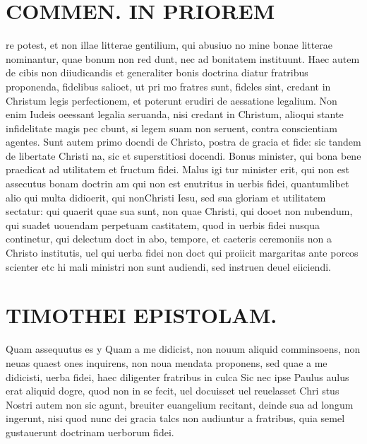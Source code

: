 \documentclass{article}
\begin{document}
\begin{pages}
\section*{COMMEN. IN PRIOREM }
\marginpar{[ p.102 ]}\pstart re potest, et non illae litterae gentilium, qui abusiuo no mine bonae litterae nominantur, quae bonum non red dunt, nec ad bonitatem instituunt. Haec autem de cibis non diiudicandis et generaliter bonis doctrina diatur fratribus proponenda, fidelibus salioet, ut pri mo fratres sunt, fideles sint, credant in Christum legis perfectionem, et poterunt erudiri de aessatione legalium. Non enim Iudeis oeessant legalia seruanda, nisi credant in Christum, alioqui stante infidelitate magis pec cbunt, si legem suam non seruent, contra conscientiam agentes. Sunt autem primo docndi de Christo, postra de gracia et fide: sic tandem de libertate Christi na, sic et superstitiosi docendi. Bonus minister, qui bona bene praedicat ad utilitatem et fructum fidei. Malus igi tur minister erit, qui non est assecutus bonam doctrin am qui non est enutritus in uerbis fidei, quantumlibet alio qui multa didioerit, qui nonChristi Iesu, sed sua gloriam et utilitatem sectatur: qui quaerit quae sua sunt, non quae Christi, qui dooet non nubendum, qui suadet uouendam perpetuam castitatem, quod in uerbis fidei nusqua continetur, qui delectum doct in abo, tempore, et caeteris ceremoniis non a Christo institutis, uel qui uerba fidei non doct qui proiicit margaritas ante porcos scienter etc hi mali ministri non sunt audiendi, sed instruen deuel eiiciendi.  \pend
\section*{TIMOTHEI EPISTOLAM. }
\marginpar{[ p.103 ]}\pstart Quam assequutus es y Quam a me didicist, non nouum aliquid comminsoens, non neuas quaest ones inquirens, non noua mendata proponens, sed quae a me didicisti, uerba fidei, haec diligenter fratribus in culca Sic nec ipse Paulus aulus erat aliquid dogre, quod non in se fecit, uel docuisset uel reuelasset Chri stus Nostri autem non sic agunt, breuiter euangelium recitant, deinde sua ad longum ingerunt, nisi quod nunc dei gracia talcs non audiuntur a fratribus, quia semel gustauerunt doctrinam uerborum fidei.  \pend
{}
{}

\end{pages}
\end{document}
